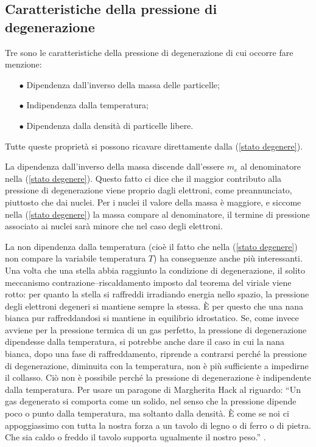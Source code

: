 \subsection{Caratteristiche della pressione di degenerazione}\label{propdeg}
Tre sono le caratteristiche della pressione di degenerazione di cui occorre fare menzione:
\begin{enumerate}
\item[$\bullet$]
Dipendenza dall'inverso della massa delle particelle;
\item[$\bullet$]
Indipendenza dalla temperatura;
\item[$\bullet$]
Dipendenza dalla densit\`{a} di particelle libere.
\end{enumerate}
Tutte queste propriet\`{a} si possono ricavare direttamente dalla (\ref{stato degenere}).
\par
La dipendenza dall'inverso della massa discende dall'essere $m_{e}$ al denominatore nella (\ref{stato degenere}). Questo fatto ci dice che il maggior contributo alla pressione di degenerazione viene proprio dagli elettroni, come preannunciato, piuttosto che dai nuclei.
Per i nuclei il valore della massa è maggiore, e siccome nella (\ref{stato degenere}) la massa compare al denominatore, il termine di pressione associato ai nuclei sar\`{a} minore che nel caso degli elettroni.
\par

\smallskip

La non dipendenza dalla temperatura (cioè il fatto che nella (\ref{stato degenere}) non compare la variabile temperatura $T$) ha conseguenze anche più interessanti.
Una volta che una stella abbia raggiunto la condizione di degenerazione, il solito meccanismo contrazione--riscaldamento imposto dal teorema del viriale viene rotto: per quanto la stella si raffreddi irradiando energia nello spazio, la pressione degli elettroni degeneri si mantiene sempre la stessa. \`E per questo che una nana bianca pur raffreddandosi si mantiene in equilibrio idrostatico. Se, come invece avviene per la pressione termica di un gas perfetto, la pressione di degenerazione dipendesse dalla temperatura, si potrebbe anche dare il caso in cui la nana bianca, dopo una fase di raffreddamento, riprende a contrarsi perch\'{e} la pressione di degenerazione, diminuita con la temperatura, non è più sufficiente a impedirne il collasso. Ciò non è possibile perch\'{e} la pressione di degenerazione è indipendente dalla temperatura.
Per usare un paragone di Margherita Hack al riguardo: ``Un gas degenerato si comporta come un solido, nel senso che la pressione dipende poco o punto dalla temperatura, ma soltanto dalla densit\`{a}. \`E come se noi ci appoggiassimo con tutta la nostra forza a un tavolo di legno o di ferro o di pietra. Che sia caldo o freddo il tavolo supporta ugualmente il nostro peso.'' \citep{hack}.
\par

